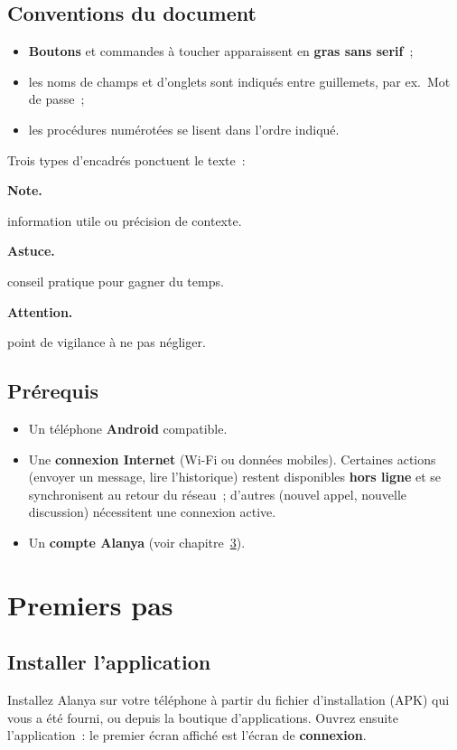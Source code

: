 \documentclass[11pt,a4paper,oneside]{report}
\newcommand{\bouton}[1]{\textbf{\textsf{#1}}}
\newcommand{\champ}[1]{\og{}#1\fg{}}
\newenvironment{note}[1][Note]{%
  \begin{tcolorbox}[enhanced, frame hidden, interior hidden,
    borderline west={3pt}{0pt}{AlanyaIndigo}, left=10pt, top=3pt, bottom=3pt,
    sharp corners, colback=white, before skip=\medskipamount, after skip=\medskipamount]%
  \small\textbf{\textcolor{AlanyaIndigoDark}{#1.}}\space\ignorespaces
}{\end{tcolorbox}}
\newenvironment{astuce}{%
  \begin{tcolorbox}[enhanced, frame hidden, interior hidden,
    borderline west={3pt}{0pt}{AlanyaGreen}, left=10pt, top=3pt, bottom=3pt,
    sharp corners, colback=white, before skip=\medskipamount, after skip=\medskipamount]%
  \small\textbf{\textcolor{AlanyaGreen}{Astuce.}}\space\ignorespaces
}{\end{tcolorbox}}
\newenvironment{attention}{%
  \begin{tcolorbox}[enhanced, frame hidden, interior hidden,
    borderline west={3pt}{0pt}{AlanyaAmber}, left=10pt, top=3pt, bottom=3pt,
    sharp corners, colback=white, before skip=\medskipamount, after skip=\medskipamount]%
  \small\textbf{\textcolor{AlanyaAmber}{Attention.}}\space\ignorespaces
}{\end{tcolorbox}}
\begin{document}
\section{Conventions du document}
\begin{itemize}[leftmargin=1.3em]
  \item \bouton{Boutons} et commandes \`{a} toucher apparaissent en \textbf{gras sans serif}~;
  \item les noms de champs et d'onglets sont indiqu\'{e}s entre guillemets, par ex.\ \champ{Mot de passe}~;
  \item les proc\'{e}dures num\'{e}rot\'{e}es se lisent dans l'ordre indiqu\'{e}.
\end{itemize}
Trois types d'encadr\'{e}s ponctuent le texte~:
\begin{note}
information utile ou pr\'{e}cision de contexte.
\end{note}
\begin{astuce}
conseil pratique pour gagner du temps.
\end{astuce}
\begin{attention}
point de vigilance \`{a} ne pas n\'{e}gliger.
\end{attention}

\section{Pr\'{e}requis}
\begin{itemize}[leftmargin=1.3em]
  \item Un t\'{e}l\'{e}phone \textbf{Android} compatible.
  \item Une \textbf{connexion Internet} (Wi-Fi ou donn\'{e}es mobiles). Certaines actions
        (envoyer un message, lire l'historique) restent disponibles \textbf{hors ligne}
        et se synchronisent au retour du r\'{e}seau~; d'autres (nouvel appel, nouvelle
        discussion) n\'{e}cessitent une connexion active.
  \item Un \textbf{compte Alanya} (voir chapitre~\ref{chap:premierspas}).
\end{itemize}

\chapter{Premiers pas}
\label{chap:premierspas}

\section{Installer l'application}
Installez Alanya sur votre t\'{e}l\'{e}phone \`{a} partir du fichier d'installation (APK)
qui vous a \'{e}t\'{e} fourni, ou depuis la boutique d'applications. Ouvrez ensuite
l'application~: le premier \'{e}cran affich\'{e} est l'\'{e}cran de \textbf{connexion}.
\end{document}
